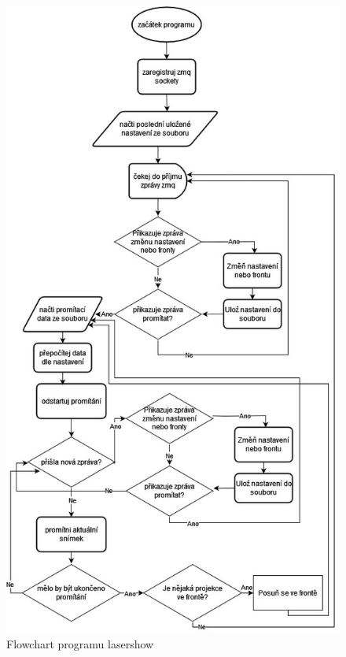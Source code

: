 \documentclass{template/socthesis}
\begin{document}
\begin{figure}[H]
  \centering
  \includegraphics[height=\paperheight]{img/lasershow_flowchart.jpg}
  \caption{\label{fig:lasershow_flowchart} Flowchart programu lasershow}
\end{figure}

\restoregeometry
\end{document}
